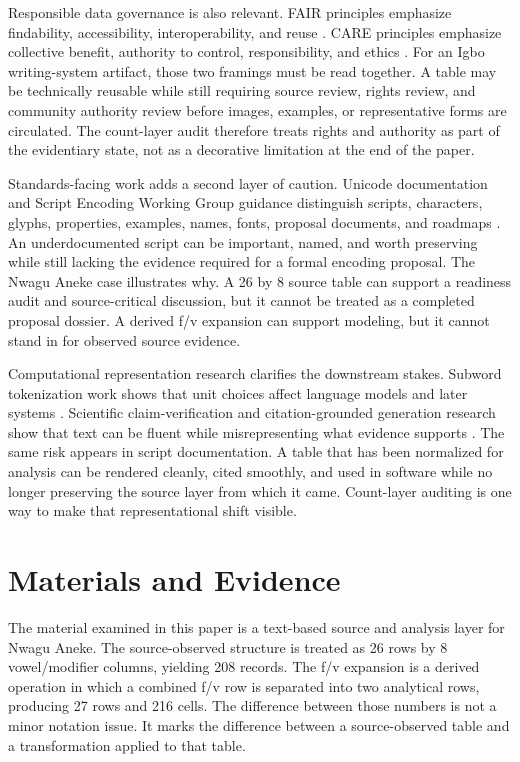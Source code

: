\documentclass[sigconf,nonacm]{acmart}
\begin{document}
Responsible data governance is also relevant. FAIR principles emphasize
findability, accessibility, interoperability, and reuse
\cite{wilkinson2016fair}. CARE principles emphasize collective benefit,
authority to control, responsibility, and ethics \cite{carroll2020care}. For an
Igbo writing-system artifact, those two framings must be read together. A table
may be technically reusable while still requiring source review, rights review,
and community authority review before images, examples, or representative forms
are circulated. The count-layer audit therefore treats rights and authority as
part of the evidentiary state, not as a decorative limitation at the end of the
paper.

Standards-facing work adds a second layer of caution. Unicode documentation and
Script Encoding Working Group guidance distinguish scripts, characters, glyphs,
properties, examples, names, fonts, proposal documents, and roadmaps
\cite{unicodeAfricanScripts2023,unicode17CoreSpec,unicodeProposals,unicodeRoadmaps,unicodePipeline2026,seiProposalTips}.
An underdocumented script can be important, named, and worth preserving while
still lacking the evidence required for a formal encoding proposal. The
Nwagu Aneke case illustrates why. A 26 by 8 source table can support a
readiness audit and source-critical discussion, but it cannot be treated as a
completed proposal dossier. A derived f/v expansion can support modeling, but it
cannot stand in for observed source evidence.

Computational representation research clarifies the downstream stakes. Subword
tokenization work shows that unit choices affect language models and later
systems \cite{sennrich2016bpe,kudo2018sentencepiece,bostrom2020bytepair,rust2021tokenization}.
Scientific claim-verification and citation-grounded generation research show
that text can be fluent while misrepresenting what evidence supports
\cite{wadden2020scifact,gao2023alce}. The same risk appears in script
documentation. A table that has been normalized for analysis can be rendered
cleanly, cited smoothly, and used in software while no longer preserving the
source layer from which it came. Count-layer auditing is one way to make that
representational shift visible.

\section{Materials and Evidence}
The material examined in this paper is a text-based source and analysis layer
for Nwagu Aneke. The source-observed structure is treated as 26 rows by
8 vowel/modifier columns, yielding 208 records. The f/v expansion is a derived
operation in which a combined f/v row is separated into two analytical rows,
producing 27 rows and 216 cells. The difference between those numbers is not a
minor notation issue. It marks the difference between a source-observed table
and a transformation applied to that table.
\end{document}

